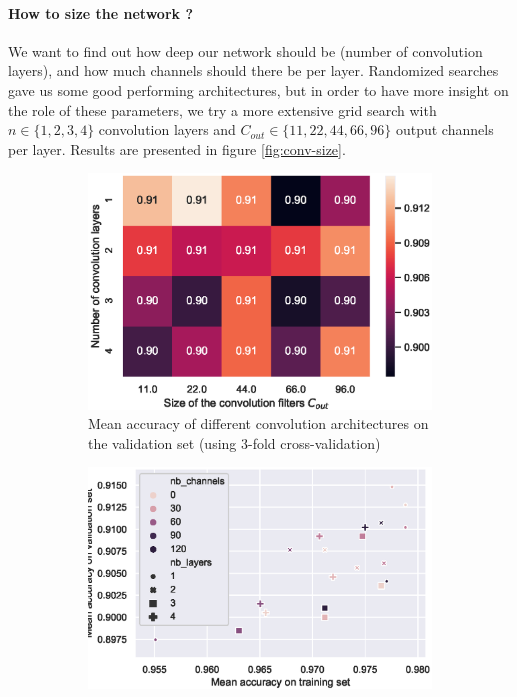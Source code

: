 \documentclass{article}
\begin{document}
\paragraph{How to size the network ?} \label{section:conv-size}
We want to find out how deep our network should be (number of convolution layers), and how much channels should there be per layer.
Randomized searches gave us some good performing architectures, but in order to have more insight on the role of these parameters, we try a more extensive grid search with $n \in \{1, 2, 3, 4\}$ convolution layers and $C_{out} \in \{11, 22, 44, 66, 96\}$ output channels per layer.
Results are presented in figure \ref{fig:conv-size}.
\begin{figure}
    \centering
    \begin{subfigure}{0.45\linewidth}
        \includegraphics[width=\linewidth]{img/heatmap-conv-layers-nb-size.eps}
        \caption{Mean accuracy of different convolution architectures on the validation set (using 3-fold cross-validation)}
        \label{fig:heatmap-conv-layers-nb-size}            
    \end{subfigure}
    \begin{subfigure}{0.45\linewidth}
        \includegraphics[width=\linewidth]{img/scatter-conv-layers-nb-size.eps}

\end{subfigure}
\end{figure}
\end{document}
